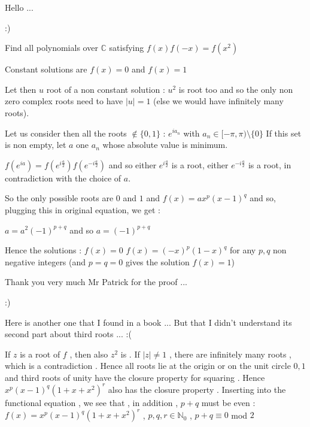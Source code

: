 \begin{solution}
	\begin{tcolorbox}\begin{bolded}Hello ...\end{bolded}  :) 

Find all polynomials over $\mathbb{C}$ satisfying $f(x)f(-x)=f(x^2)$\end{tcolorbox}
Constant solutions are $f(x)=0$ and $f(x)=1$

Let then $u$ root of a non constant solution : $u^2$ is root too and so the only non zero complex roots need to have $|u|=1$ (else we would have infinitely many roots).

Let us consider then all the roots $\notin\{0,1\}$ :  $e^{ia_n}$ with $a_n\in[-\pi,\pi)\setminus\{0\}$
If this set is non empty, let $a$ one $a_n$ whose absolute value is minimum.

$f(e^{ia})=f(e^{i\frac {a}2})f(e^{-i\frac {a}2})$ and so either $e^{i\frac {a}2}$ is a root, either $e^{-i\frac {a}2}$ is a root, in contradiction with the choice of $a$.

So the only possible roots are $0$ and $1$ and $f(x)=ax^p(x-1)^q$ and so, plugging this in original equation, we get :

$a=a^2(-1)^{p+q}$ and so $a=(-1)^{p+q}$

Hence the solutions :
$f(x)=0$
$f(x)=(-x)^p(1-x)^q$ for any $p,q$ non negative integers (and $p=q=0$ gives the solution $f(x)=1$)
\end{solution}



\begin{solution}
	\begin{bolded}Thank you very much Mr Patrick for the proof ... \end{bolded} :)

Here is another one that I found in a book ... But that I didn't understand its second part about third roots ...  :( 

If $z$ is a root of $f$ , then also $z^2$ is . If $\left | z \right |\neq 1$ , there are infinitely many roots , which is a contradiction . Hence all roots lie at the origin or on the unit circle $0,1$ and third roots of unity have the closure property for squaring . Hence $x^p(x-1)^q(1+x+x^2)^r$ also has the closure property . Inserting into the functional equation , we see that , in addition ,  $p+q$ must be even :
$f(x)=x^p(x-1)^q(1+x+x^2)^r$ , $p,q,r \in \mathbb{N}_{0}$ , $p+q \equiv 0$ mod $2$
\end{solution}



